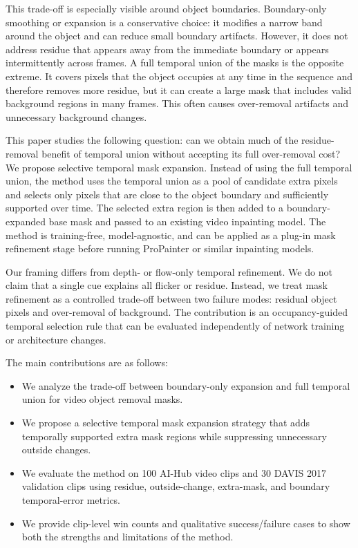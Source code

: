 \documentclass[nouppercase]{kaia}
\begin{document}
This trade-off is especially visible around object boundaries. Boundary-only smoothing or expansion is a conservative choice: it modifies a narrow band around the object and can reduce small boundary artifacts. However, it does not address residue that appears away from the immediate boundary or appears intermittently across frames. A full temporal union of the masks is the opposite extreme. It covers pixels that the object occupies at any time in the sequence and therefore removes more residue, but it can create a large mask that includes valid background regions in many frames. This often causes over-removal artifacts and unnecessary background changes.

This paper studies the following question: can we obtain much of the residue-removal benefit of temporal union without accepting its full over-removal cost? We propose selective temporal mask expansion. Instead of using the full temporal union, the method uses the temporal union as a pool of candidate extra pixels and selects only pixels that are close to the object boundary and sufficiently supported over time. The selected extra region is then added to a boundary-expanded base mask and passed to an existing video inpainting model. The method is training-free, model-agnostic, and can be applied as a plug-in mask refinement stage before running ProPainter or similar inpainting models.

Our framing differs from depth- or flow-only temporal refinement. We do not claim that a single cue explains all flicker or residue. Instead, we treat mask refinement as a controlled trade-off between two failure modes: residual object pixels and over-removal of background. The contribution is an occupancy-guided temporal selection rule that can be evaluated independently of network training or architecture changes.

The main contributions are as follows:
\begin{itemize}
    \item We analyze the trade-off between boundary-only expansion and full temporal union for video object removal masks.
    \item We propose a selective temporal mask expansion strategy that adds temporally supported extra mask regions while suppressing unnecessary outside changes.
    \item We evaluate the method on 100 AI-Hub video clips and 30 DAVIS 2017 validation clips using residue, outside-change, extra-mask, and boundary temporal-error metrics.
    \item We provide clip-level win counts and qualitative success/failure cases to show both the strengths and limitations of the method.
\end{itemize}
\end{document}
